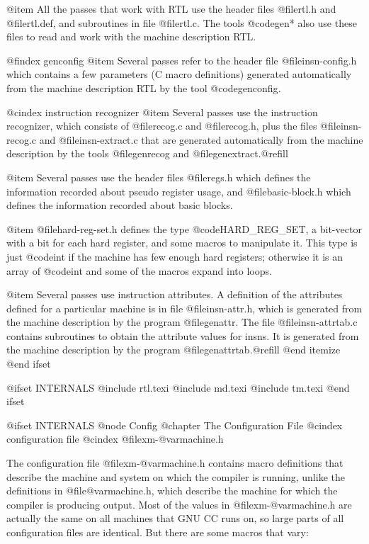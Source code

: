 @item
All the passes that work with RTL use the header files @file{rtl.h}
and @file{rtl.def}, and subroutines in file @file{rtl.c}.  The tools
@code{gen*} also use these files to read and work with the machine
description RTL.

@findex genconfig
@item
Several passes refer to the header file @file{insn-config.h} which
contains a few parameters (C macro definitions) generated
automatically from the machine description RTL by the tool
@code{genconfig}.

@cindex instruction recognizer
@item
Several passes use the instruction recognizer, which consists of
@file{recog.c} and @file{recog.h}, plus the files @file{insn-recog.c}
and @file{insn-extract.c} that are generated automatically from the
machine description by the tools @file{genrecog} and
@file{genextract}.@refill

@item
Several passes use the header files @file{regs.h} which defines the
information recorded about pseudo register usage, and @file{basic-block.h}
which defines the information recorded about basic blocks.

@item
@file{hard-reg-set.h} defines the type @code{HARD_REG_SET}, a bit-vector
with a bit for each hard register, and some macros to manipulate it.
This type is just @code{int} if the machine has few enough hard registers;
otherwise it is an array of @code{int} and some of the macros expand
into loops.

@item
Several passes use instruction attributes.  A definition of the
attributes defined for a particular machine is in file
@file{insn-attr.h}, which is generated from the machine description by
the program @file{genattr}.  The file @file{insn-attrtab.c} contains
subroutines to obtain the attribute values for insns.  It is generated
from the machine description by the program @file{genattrtab}.@refill
@end itemize
@end ifset

@ifset INTERNALS
@include rtl.texi
@include md.texi
@include tm.texi
@end ifset

@ifset INTERNALS
@node Config
@chapter The Configuration File
@cindex configuration file
@cindex @file{xm-@var{machine}.h}

The configuration file @file{xm-@var{machine}.h} contains macro
definitions that describe the machine and system on which the compiler
is running, unlike the definitions in @file{@var{machine}.h}, which
describe the machine for which the compiler is producing output.  Most
of the values in @file{xm-@var{machine}.h} are actually the same on all
machines that GNU CC runs on, so large parts of all configuration files
are identical.  But there are some macros that vary:


